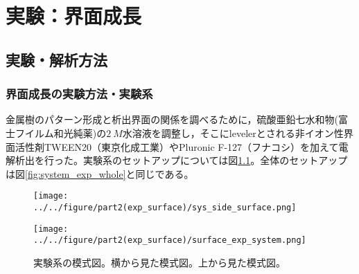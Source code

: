 \documentclass[autodetect-engine,dvi=dvipdfmx,a4paper,ja=standard,oneside,openany,11pt]{bxjsbook}
\begin{document}
\chapter{実験：界面成長}
\section{実験・解析方法}
\subsection{界面成長の実験方法・実験系}
金属樹のパターン形成と析出界面の関係を調べるために，硫酸亜鉛七水和物(富士フイルム和光純薬)の$\SI{2}{M}$水溶液を調整し，そこにlevelerとされる非イオン性界面活性剤TWEEN20（東京化成工業）やPluronic F-127（フナコシ）を加えて電解析出を行った。実験系のセットアップについては図\ref{fig:surface_exp_system}。全体のセットアップは図\ref{fig:system_exp_whole}と同じである。

\begin{figure}[htbp]
  \begin{minipage}
    {0.55\textwidth}
    \subcaption{}
    \centering
    \texttt{[image: ../../figure/part2(exp\_surface)/sys\_side\_surface.png]}
    \label{fig:sys_side_surface}
  \end{minipage}
  \begin{minipage}{0.4\hsize}
    \subcaption{}
    \centering
    \texttt{[image: ../../figure/part2(exp\_surface)/surface\_exp\_system.png]}
    \label{fig:sys_top_surface}
  \end{minipage}
  \caption{実験系の模式図。横から見た模式図。上から見た模式図。}
  \label{fig:surface_exp_system}
\end{figure}
\end{document}
